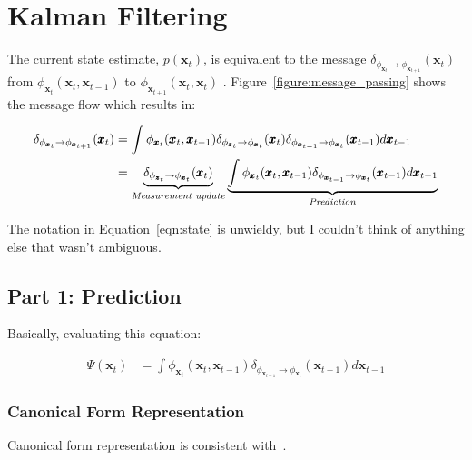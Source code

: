 \chapter{Kalman Filtering}
\label{chapter:filtering_equations}

The current state estimate, $p\left( \pmb{x}_{t} \right)$, is equivalent to the message $\delta_{\phi_{\pmb{x}_{t}} \rightarrow \phi_{\pmb{x}_{t+1}}}(\pmb{x}_{t})$ from $\phi_{\pmb{x}_{t}}(\pmb{x}_{t}, \pmb{x}_{t-1})$ to $\phi_{\pmb{x}_{t+1}}(\pmb{x}_{t}, \pmb{x}_{t})$ . Figure~\ref{figure:message_passing} shows the message flow which results in:



\begin{align}
\delta_{\phi_{\pmb{x}_{t}} \rightarrow \phi_{\pmb{x}_{t+1}}}(\pmb{x}_{t}) &= \int \phi_{\pmb{x}_{t}}(\pmb{x}_{t}, \pmb{x}_{t-1}) \delta_{\phi_{\pmb{z}_{t}} \rightarrow \phi_{\pmb{x}_{t}}} (\pmb{x}_{t}) \delta_{\phi_{\pmb{x}_{t-1}} \rightarrow \phi_{\pmb{x}_{t}}} (\pmb{x}_{t-1}) d\pmb{x}_{t-1} \nonumber \\
&= \underbrace{ \delta_{\phi_{\pmb{z}_{t}} \rightarrow \phi_{\pmb{x}_{t}}} (\pmb{x}_{t}) }_\text{\textit{Measurement update}} \underbrace{ \int \phi_{\pmb{x}_{t}}(\pmb{x}_{t}, \pmb{x}_{t-1})  \delta_{\phi_{\pmb{x}_{t-1}} \rightarrow \phi_{\pmb{x}_{t}}} (\pmb{x}_{t-1}) d\pmb{x}_{t-1} }_\text{\textit{Prediction}} \label{eqn:state}
\end{align}

\begin{remark}
The notation in Equation~\ref{eqn:state} is unwieldy, but I couldn't think of anything else that wasn't ambiguous.
\end{remark}

\section{Part 1: Prediction}
\label{section:prediction}
Basically, evaluating this equation:

\begin{align}
\Psi(\pmb{x}_{t}) &= \int \phi_{\pmb{x}_{t}}(\pmb{x}_{t}, \pmb{x}_{t-1})  \delta_{\phi_{\pmb{x}_{t-1}} \rightarrow \phi_{\pmb{x}_{t}}} (\pmb{x}_{t-1}) d\pmb{x}_{t-1}  \label{eqn:rec_bel}
\end{align}

\subsection{Canonical Form Representation}
\label{subsection:canonical}
Canonical form representation is consistent with~\cite{Koller_canonical}.

